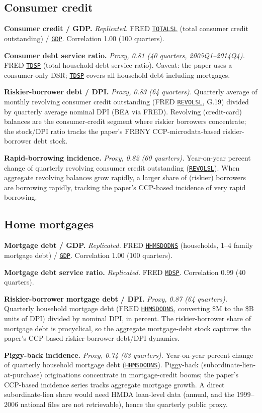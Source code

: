 \documentclass[11pt]{article}
\newcommand{\fred}[1]{\href{https://fred.stlouisfed.org/series/#1}{\texttt{#1}}}
\begin{document}
\subsection{Consumer credit}

\textbf{Consumer credit / GDP.} \textit{Replicated.} FRED
\fred{TOTALSL} (total consumer credit outstanding) / \fred{GDP}.
Correlation 1.00 (100 quarters).

\textbf{Consumer debt service ratio.} \textit{Proxy, 0.81 (40 quarters,
2005Q1--2014Q4).} FRED \fred{TDSP} (total household debt service
ratio).  Caveat: the paper uses a consumer-only DSR; \fred{TDSP}
covers all household debt including mortgages.

\textbf{Riskier-borrower debt / DPI.} \textit{Proxy, 0.83 (64
quarters).} Quarterly average of monthly revolving consumer credit
outstanding (FRED \fred{REVOLSL}, G.19) divided by quarterly average
nominal DPI (BEA via FRED).  Revolving (credit-card) balances are the
consumer-credit segment where riskier borrowers concentrate; the
stock/DPI ratio tracks the paper's FRBNY CCP-microdata-based
riskier-borrower debt stock.

\textbf{Rapid-borrowing incidence.} \textit{Proxy, 0.82 (60 quarters).}
Year-on-year percent change of quarterly revolving consumer credit
outstanding (\fred{REVOLSL}).  When aggregate revolving balances grow
rapidly, a larger share of (riskier) borrowers are borrowing rapidly,
tracking the paper's CCP-based incidence of very rapid borrowing.

\subsection{Home mortgages}

\textbf{Mortgage debt / GDP.} \textit{Replicated.} FRED
\fred{HHMSDODNS} (households, 1--4 family mortgage debt) /
\fred{GDP}.  Correlation 1.00 (100 quarters).

\textbf{Mortgage debt service ratio.} \textit{Replicated.} FRED
\fred{MDSP}.  Correlation 0.99 (40 quarters).

\textbf{Riskier-borrower mortgage debt / DPI.} \textit{Proxy, 0.87 (64
quarters).} Quarterly household mortgage debt (FRED \fred{HHMSDODNS},
converting \$M to the \$B units of DPI) divided by nominal DPI, in
percent.  The riskier-borrower share of mortgage debt is procyclical,
so the aggregate mortgage-debt stock captures the paper's CCP-based
riskier-borrower debt/DPI dynamics.

\textbf{Piggy-back incidence.} \textit{Proxy, 0.74 (63 quarters).}
Year-on-year percent change of quarterly household mortgage debt
(\fred{HHMSDODNS}).  Piggy-back (subordinate-lien-at-purchase)
originations concentrate in mortgage-credit booms; the paper's
CCP-based incidence series tracks aggregate mortgage growth.  A direct
subordinate-lien share would need HMDA loan-level data (annual, and the
1999--2006 national files are not retrievable), hence the quarterly
public proxy.
\end{document}
